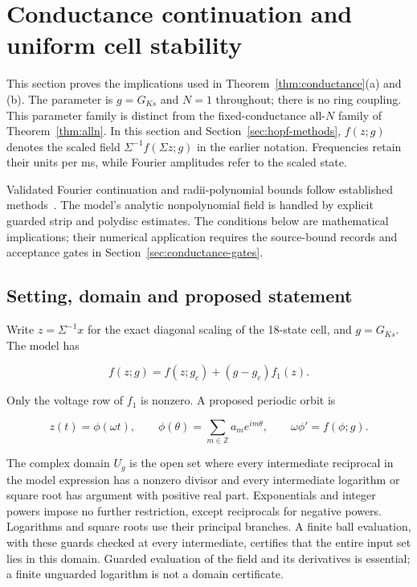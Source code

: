 \documentclass[11pt]{article}
\theoremstyle{definition}
\begin{document}
\section{Conductance continuation and uniform cell stability}\label{sec:conductance-methods}

This section proves the implications used in Theorem~\ref{thm:conductance}(a) and (b). The parameter is $g=G_{Ks}$ and $N=1$ throughout; there is no ring coupling. This parameter family is distinct from the fixed-conductance all-$N$ family of Theorem~\ref{thm:alln}. In this section and Section~\ref{sec:hopf-methods}, $f(z;g)$ denotes the scaled field $\Sigma^{-1}f(\Sigma z;g)$ in the earlier notation. Frequencies retain their units per ms, while Fourier amplitudes refer to the scaled state.

Validated Fourier continuation and radii-polynomial bounds follow established methods~\cite{vblm2010,vbq2021}. The model's analytic nonpolynomial field is handled by explicit guarded strip and polydisc estimates. The conditions below are mathematical implications; their numerical application requires the source-bound records and acceptance gates in Section~\ref{sec:conductance-gates}.

\subsection{Setting, domain and proposed statement}\label{sec:cg-1}

Write $z=\Sigma^{-1}x$ for the exact diagonal scaling of the 18-state cell, and $g=G_{Ks}$. The model has

\[
 f(z;g)=f(z;g_c)+(g-g_c)f_1(z).
\]

Only the voltage row of $f_1$ is nonzero. A proposed periodic orbit is

\[
 z(t)=\phi(\omega t),\qquad
 \phi(\theta)=\sum_{m\in\mathbb Z}a_m e^{im\theta},\qquad
 \omega\phi'=f(\phi;g).
\]

The complex domain $U_g$ is the open set where every intermediate reciprocal in the model expression has a nonzero divisor and every intermediate logarithm or square root has argument with positive real part. Exponentials and integer powers impose no further restriction, except reciprocals for negative powers. Logarithms and square roots use their principal branches. A finite ball evaluation, with these guards checked at every intermediate, certifies that the entire input set lies in this domain. Guarded evaluation of the field and its derivatives is essential; a finite unguarded logarithm is not a domain certificate.
\end{document}
